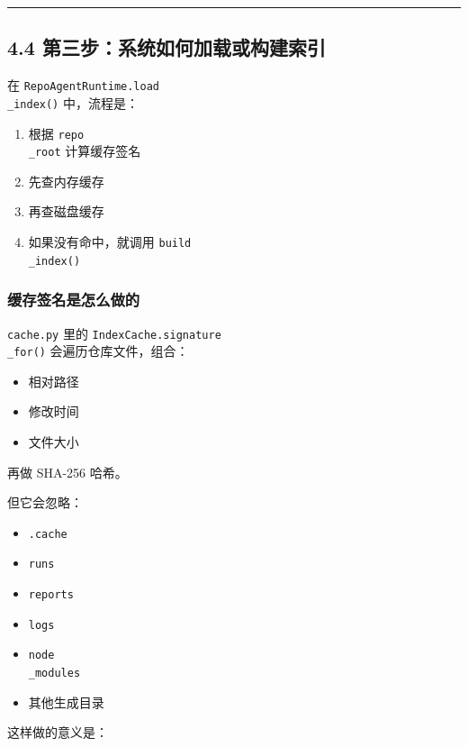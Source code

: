 \documentclass[UTF8,12pt,openany]{ctexbook}
\begin{document}
\hrule

\subsection{4.4 第三步：系统如何加载或构建索引}

在 \texttt{RepoAgentRuntime.load\\_index()} 中，流程是：\par

\begin{enumerate}
\item 根据 \texttt{repo\\_root} 计算缓存签名
\item 先查内存缓存
\item 再查磁盘缓存
\item 如果没有命中，就调用 \texttt{build\\_index()}
\end{enumerate}

\subsubsection{缓存签名是怎么做的}

\texttt{cache.py} 里的 \texttt{IndexCache.signature\\_for()} 会遍历仓库文件，组合：\par

\begin{itemize}
\item 相对路径
\item 修改时间
\item 文件大小
\end{itemize}

再做 SHA-256 哈希。\par

但它会忽略：\par

\begin{itemize}
\item \texttt{.cache}
\item \texttt{runs}
\item \texttt{reports}
\item \texttt{logs}
\item \texttt{node\\_modules}
\item 其他生成目录
\end{itemize}

这样做的意义是：\par
\end{document}
